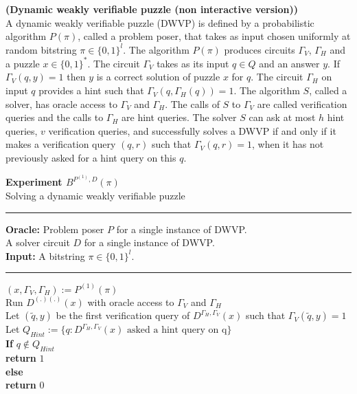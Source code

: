 %
%
%
\begin{definition} {\textbf{(Dynamic weakly verifiable puzzle (non interactive version))}}\\
  A dynamic weakly verifiable puzzle (DWVP) is defined by a probabilistic algorithm $P(\pi)$,
  called a problem poser, that takes as input chosen uniformly at random bitstring $\pi \in \{0,1\}^l$.
  The algorithm $P(\pi)$ produces circuits $\Gamma_{V}$, $\Gamma_{H}$ and a puzzle $x \in \{0,1\}^{*}$.
  The circuit $\Gamma_{V}$ takes as its input $q \in Q$ and an answer $y$.
  If $\Gamma_V(q,y) = 1$ then $y$ is a correct solution of puzzle $x$ for $q$.
  The circuit $\Gamma_H$ on input $q$ provides a hint such that $\Gamma_V(q,\Gamma_H(q)) = 1$.
  The algorithm $S$, called a solver, has oracle access to $\Gamma_V$ and $\Gamma_H$.
  The calls of $S$ to $\Gamma_V$ are called verification queries and the calls to $\Gamma_H$ are hint queries.
  The solver $S$ can ask at most $h$ hint queries, $v$ verification queries, and successfully solves a DWVP if and only if
  it makes a verification query $(q,r)$ such that $\Gamma_V(q,r) = 1$, when it has not previously asked for a hint query on this $q$.
\end{definition}
%
%
%
\begin{codeblock}
  \textbf{Experiment $B^{P^{(1)}, D}(\pi)$} \\
  Solving a dynamic weakly verifiable puzzle
  \medskip

  \hrule

  \medskip

  \textbf{Oracle:} Problem poser $P$ for a single instance of DWVP. \\
                   \IndII A solver circuit $D$ for a single instance of DWVP. \\
  \textbf{Input:}  A bitstring $\pi \in \{0,1\}^{l}$.\\

  \medskip\hrule\medskip

  $(x, \Gamma_V, \Gamma_H) := P^{(1)}(\pi)$ \\
  Run $D^{(.)(.)}(x)$ with oracle access to $\Gamma_V$ and $\Gamma_H$ \\
  \IndI Let $(\widetilde{q},y)$ be the first verification query of $D^{\Gamma_H, \Gamma_V}(x)$ such that $\Gamma_V(\widetilde{q},y) = 1$ \\
  \IndI Let $Q_{Hint} := \{q: \text{$D^{\Gamma_H, \Gamma_V}(x)$ asked a hint query on q} \}$\\
  \textbf{If} $q \notin Q_{Hint}$\\
  \IndI \textbf{return} $1$\\
  \textbf{else}\\
  \IndI \textbf{return} $0$\\
\end{codeblock}
